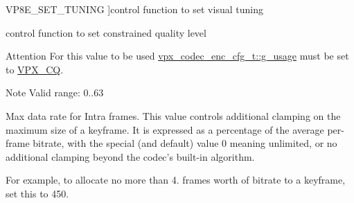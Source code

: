 \begin{Desc}
\begin{description}
{\hypertarget{group__vp8__encoder_gga6deae3d561c838952552c3d3756322eca126ccbe7bde63b59cec5ea68a82dd498}{V\+P8\+E\+\_\+\+S\+E\+T\+\_\+\+T\+U\+N\+I\+N\+G}\label{group__vp8__encoder_gga6deae3d561c838952552c3d3756322eca126ccbe7bde63b59cec5ea68a82dd498}
}]control function to set visual tuning \item[{\em 
\hypertarget{group__vp8__encoder_gga6deae3d561c838952552c3d3756322ecacd4f5b730bddb9788c3d0b82218ec503}{V\+P8\+E\+\_\+\+S\+E\+T\+\_\+\+C\+Q\+\_\+\+L\+E\+V\+E\+L}\label{group__vp8__encoder_gga6deae3d561c838952552c3d3756322ecacd4f5b730bddb9788c3d0b82218ec503}
}]control function to set constrained quality level \begin{DoxyAttention}{Attention}
For this value to be used \hyperlink{structvpx__codec__enc__cfg_a5bcf7fc1efc4890de351e3c6fe252355}{vpx\+\_\+codec\+\_\+enc\+\_\+cfg\+\_\+t\+::g\+\_\+usage} must be set to \hyperlink{group__encoder_ggaf50e74d91be4cae6f70dfeba5b7410d2a5f2fd02b55c67d62bfd79380bcb03f63}{V\+P\+X\+\_\+\+C\+Q}. 
\end{DoxyAttention}
\begin{DoxyNote}{Note}
Valid range\+: 0..63 
\end{DoxyNote}
\item[{\em 
\hypertarget{group__vp8__encoder_gga6deae3d561c838952552c3d3756322eca09c69ff4a3aabdb307d4f24027dfc4c1}{V\+P8\+E\+\_\+\+S\+E\+T\+\_\+\+M\+A\+X\+\_\+\+I\+N\+T\+R\+A\+\_\+\+B\+I\+T\+R\+A\+T\+E\+\_\+\+P\+C\+T}\label{group__vp8__encoder_gga6deae3d561c838952552c3d3756322eca09c69ff4a3aabdb307d4f24027dfc4c1}
}]Max data rate for Intra frames. This value controls additional clamping on the maximum size of a keyframe. It is expressed as a percentage of the average per-\/frame bitrate, with the special (and default) value 0 meaning unlimited, or no additional clamping beyond the codec's built-\/in algorithm.

For example, to allocate no more than 4. frames worth of bitrate to a keyframe, set this to 450. \end{description}
\end{Desc}
